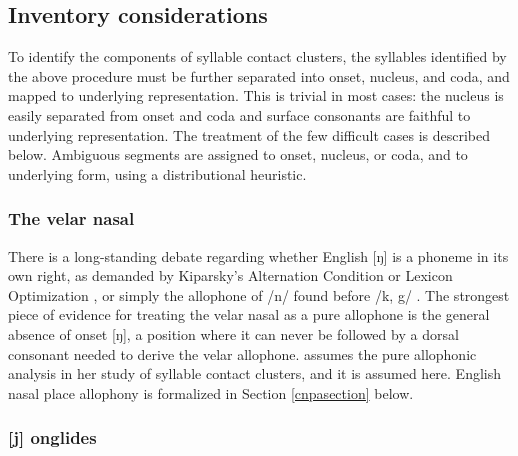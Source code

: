 \subsection{Inventory considerations}

To identify the components of syllable contact clusters, the syllables identified by the above procedure must be further separated into onset, nucleus, and coda, and mapped to underlying representation. This is trivial in most cases: the nucleus is easily separated from onset and coda and surface consonants are faithful to underlying representation. The treatment of the few difficult cases is described below. Ambiguous segments are assigned to onset, nucleus, or coda, and to underlying form, using a distributional heuristic. 

\subsubsection{The velar nasal}
\label{velarnasal}

There is a long-standing debate regarding whether English [ŋ] is a phoneme in its own right, as demanded by Kiparsky's Alternation Condition \citep{Kiparsky1968} or Lexicon Optimization \citep[][53]{OT}, or simply the allophone of /n/ found before /k, g/ \citep[][65]{Borowsky1986}. The strongest piece of evidence for treating the velar nasal as a pure allophone is the general absence of onset [ŋ], a position where it can never be followed by a dorsal consonant needed to derive the velar allophone. \citet{Pierrehumbert1994} assumes the pure allophonic analysis in her study of syllable contact clusters, and it is assumed here. English nasal place allophony is formalized in Section \ref{cnpasection} below.

\subsubsection{[j] onglides}

